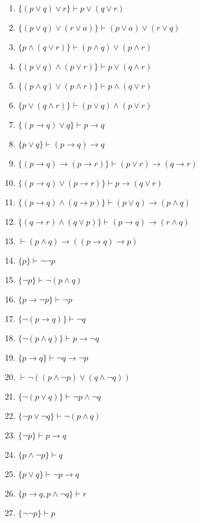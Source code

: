 \begin{enumerate}
    \item \(\{(p \lor q) \lor r\} \vdash p \lor (q \lor r)\)
    \item \(\{(p \lor q) \lor (r \lor a)\} \vdash (p \lor a) \lor (r \lor q)\)
    \item \(\{p \land (q \lor r)\} \vdash (p \land q) \lor (p \land r)\)
    \item \(\{(p \lor q) \land (p \lor r)\} \vdash p \lor (q \land r)\)
    \item \(\{(p \land q) \lor (p \land r)\} \vdash p \land (q \lor r)\)
    \item \(\{p \lor (q \land r)\} \vdash (p \lor q) \land (p \lor r)\)
    \item \(\{(p \to q) \lor q\} \vdash p \to q\)
    \item \(\{p \lor q\} \vdash (p \to q) \to q\)
    \item \(\{(p \to q) \to (p \to r)\} \vdash (p \lor r) \to (q \to r)\)
    \item \(\{(p \to q) \lor (p \to r)\} \vdash p \to (q \lor r)\)
    \item \(\{(p \to q) \land (q \to p)\} \vdash (p \lor q) \to (p \land q)\)
    \item \(\{(q \to r) \land (q \lor p)\} \vdash (p \to q) \to (r \land q)\)
    \item \(\vdash (p \land q) \to ((p \to q) \to p)\)
    \item \(\{p\} \vdash \lnot \lnot p\)
    \item \(\{\lnot p\} \vdash \lnot(p \land q)\)
    \item \(\{p \to \lnot p\} \vdash \lnot p\)
    \item \(\{\lnot(p \to q)\} \vdash \lnot q\)
    \item \(\{\lnot(p \land q)\} \vdash p \to \lnot q\)
    \item \(\{p \to q\} \vdash \lnot q \to \lnot p\)
    \item \(\vdash \lnot((p \land \lnot p) \lor (q \land \lnot q))\)
    \item \(\{\lnot(p \lor q)\} \vdash \lnot p \land \lnot q\)
    \item \(\{\lnot p \lor \lnot q\} \vdash \lnot(p \land q)\)
    \item \(\{\lnot p\} \vdash p \to q\)
    \item \(\{p \land \lnot p\} \vdash q\)
    \item \(\{p \lor q\} \vdash \lnot p \to q\)
    \item \(\{p \to q, p \land \lnot q\} \vdash r\)
    \item \(\{\lnot \lnot p\} \vdash p\)

\end{enumerate}
